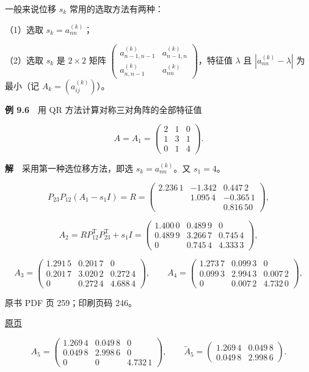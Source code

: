 一般来说位移 \(s_k\) 常用的选取方法有两种：

（1）选取 \(s_k=a_{nn}^{(k)}\)；

（2）选取 \(s_k\) 是 \(2\times2\) 矩阵 \(\begin{pmatrix}a_{n-1,n-1}^{(k)}&a_{n-1,n}^{(k)}\\a_{n,n-1}^{(k)}&a_{nn}^{(k)}\end{pmatrix}\)，特征值 \(\lambda\) 且 \(|a_{nn}^{(k)}-\lambda|\) 为最小（记 \(A_k=(a_{ij}^{(k)})\)）。

\textbf{例 9.6}　用 QR 方法计算对称三对角阵的全部特征值

\[
A=A_1=\begin{pmatrix}2&1&0\\1&3&1\\0&1&4\end{pmatrix}.
\]

\textbf{解}　采用第一种选位移方法，即选 \(s_k=a_{nn}^{(k)}\)。又 \(s_1=4\)。

\[
P_{23}P_{12}(A_1-s_1I)=R=\begin{pmatrix}
2.236\,1&-1.342&0.447\,2\\
&1.095\,4&-0.365\,1\\
&&0.816\,50
\end{pmatrix},
\]

\[
A_2=RP_{12}^{\mathrm T}P_{23}^{\mathrm T}+s_1I
=\begin{pmatrix}
1.400\,0&0.489\,9&0\\
0.489\,9&3.266\,7&0.745\,4\\
0&0.745\,4&4.333\,3
\end{pmatrix},
\]

\[
A_3=\begin{pmatrix}
1.291\,5&0.201\,7&0\\
0.201\,7&3.020\,2&0.272\,4\\
0&0.272\,4&4.688\,4
\end{pmatrix},\qquad
A_4=\begin{pmatrix}
1.273\,7&0.099\,3&0\\
0.099\,3&2.994\,3&0.007\,2\\
0&0.007\,2&4.732\,0
\end{pmatrix},
\]

\clearpage

原书 PDF 页 259；印刷页码 246。

\href{source-images/pdf-259.jpeg}{原页}

\[
A_5=\begin{pmatrix}
1.269\,4&0.049\,8&0\\
0.049\,8&2.998\,6&0\\
0&0&\boxed{4.732\,1}
\end{pmatrix},\qquad
\widetilde A_5=\begin{pmatrix}1.269\,4&0.049\,8\\0.049\,8&2.998\,6\end{pmatrix}.
\]

